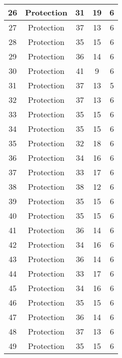 \documentclass[results.tex]{subfiles}
\begin{document}
\begin{center}
\begin{tabular}{| c || c | c | c | c |}
    \hline
    26 & Protection & 31 & 19 & 6 \\ 
    \hline
    27 & Protection & 37 & 13 & 6 \\ 
    \hline
    28 & Protection & 35 & 15 & 6 \\ 
    \hline
    29 & Protection & 36 & 14 & 6 \\ 
    \hline
    30 & Protection & 41 & 9 & 6 \\ 
    \hline
    31 & Protection & 37 & 13 & 5 \\ 
    \hline
    32 & Protection & 37 & 13 & 6 \\ 
    \hline
    33 & Protection & 35 & 15 & 6 \\ 
    \hline
    34 & Protection & 35 & 15 & 6 \\ 
    \hline
    35 & Protection & 32 & 18 & 6 \\ 
    \hline
    36 & Protection & 34 & 16 & 6 \\ 
    \hline
    37 & Protection & 33 & 17 & 6 \\ 
    \hline
    38 & Protection & 38 & 12 & 6 \\ 
    \hline
    39 & Protection & 35 & 15 & 6 \\ 
    \hline
    40 & Protection & 35 & 15 & 6 \\ 
    \hline
    41 & Protection & 36 & 14 & 6 \\ 
    \hline
    42 & Protection & 34 & 16 & 6 \\ 
    \hline
    43 & Protection & 36 & 14 & 6 \\ 
    \hline
    44 & Protection & 33 & 17 & 6 \\ 
    \hline
    45 & Protection & 34 & 16 & 6 \\ 
    \hline
    46 & Protection & 35 & 15 & 6 \\ 
    \hline
    47 & Protection & 36 & 14 & 6 \\ 
    \hline
    48 & Protection & 37 & 13 & 6 \\ 
    \hline
    49 & Protection & 35 & 15 & 6 \\ 
    \hline   \end{tabular}
\end{center}
\end{document}

